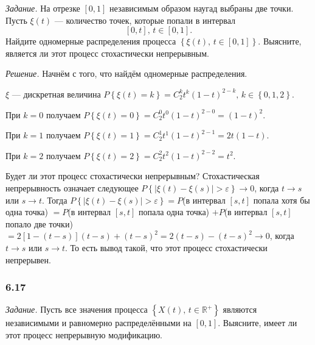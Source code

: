 \textit{Задание.}
На отрезке $ \left[ 0, 1 \right] $ независимым образом наугад выбраны две точки.
Пусть $ \xi \left( t \right) $ --- количество точек,
которые попали в интервал
$$ \left[ 0, t \right], \,
  t \in \left[ 0, 1 \right].$$
Найдите одномерные распределения процесса
$ \left\{ \xi \left( t \right), \, t \in \left[ 0, 1 \right] \right\} $.
Выясните, является ли этот процесс стохастически непрерывным.

\textit{Решение.}
Начнём с того, что найдём одномерные распределения.

$ \xi $ --- дискретная величина
$P \left\{ \xi \left( t \right) = k \right\} = C_2^k t^k \left( 1 - t \right)^{2 - k}, \,
  k \in \left\{ 0, 1, 2 \right\} $.

При $k = 0$ получаем
$P \left\{ \xi \left( t \right) = 0 \right\} =
  C_2^0 t^0 \left( 1 - t \right)^{2 - 0} =
  \left( 1 - t \right)^2$.

При $k = 1$ получаем
$P \left\{ \xi \left( t \right) = 1 \right\} =
  C_2^1 t^1 \left( 1 - t \right)^{2 - 1} =
  2t \left( 1 - t \right) $.

При $k = 2$ получаем
$P \left\{ \xi \left( t \right) = 2 \right\} =
  C_2^2 t^2 \left( 1 - t \right)^{2 - 2} =
  t^2$.

Будет ли этот процесс стохастически непрерывным?
Стохастическая непрерывность означает следующее
$P \left\{ \left| \xi \left( t \right) - \xi \left( s \right) \right| > \varepsilon \right\} \to
  0$,
когда $t \to s$ или $s \to t$.
Тогда
$P \left\{ \left| \xi \left( t \right) - \xi \left( s \right) \right| > \varepsilon \right\} =
  P$(в интервал $ \left[ s, t \right] $ попала хотя бы одна точка) $=
  P$(в интервал $ \left[ s, t \right] $ попала одна точка) $+
  P$(в интервал $ \left[ s, t \right] $ попало две точки) $=
  2 \left[ 1 - \left( t - s \right) \right] \left( t - s \right) + \left( t - s \right)^2 =
  2 \left( t - s \right) - \left( t - s \right)^2 \to
  0$,
когда $t \to s$ или $s \to t$.
То есть вывод такой, что этот процесс стохастически непрерывен.

\subsubsection*{6.17}

\textit{Задание.}
Пусть все значения процесса $ \left\{ X \left( t \right), \, t \in \mathbb{R}^+ \right\} $
являются независимыми и равномерно распределёнными на $ \left[ 0, 1 \right] $.
Выясните, имеет ли этот процесс непрерывную модификацию.

